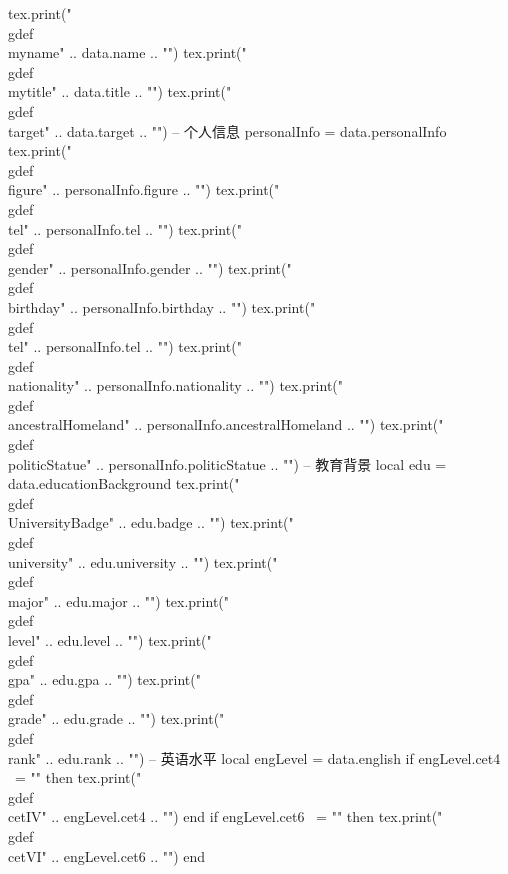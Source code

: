 \documentclass[10pt, a4paper, oneside]{ctexart}
\begin{document}
\begin{luacode}
tex.print("\\gdef\\myname{" .. data.name .. "}") 
tex.print("\\gdef\\mytitle{" .. data.title .. "}")
tex.print("\\gdef\\target{" .. data.target .. "}")
-- 个人信息
personalInfo = data.personalInfo
tex.print("\\gdef\\figure{" .. personalInfo.figure .. "}")
tex.print("\\gdef\\tel{" .. personalInfo.tel .. "}")
tex.print("\\gdef\\gender{" .. personalInfo.gender .. "}")
tex.print("\\gdef\\birthday{" .. personalInfo.birthday .. "}")
tex.print("\\gdef\\tel{" .. personalInfo.tel .. "}")
tex.print("\\gdef\\nationality{" .. personalInfo.nationality .. "}")
tex.print("\\gdef\\ancestralHomeland{" .. personalInfo.ancestralHomeland .. "}")
tex.print("\\gdef\\politicStatue{" .. personalInfo.politicStatue .. "}")
-- 教育背景
local edu = data.educationBackground
tex.print("\\gdef\\UniversityBadge{" .. edu.badge .. "}")
tex.print("\\gdef\\university{" .. edu.university .. "}")
tex.print("\\gdef\\major{" .. edu.major .. "}")
tex.print("\\gdef\\level{" .. edu.level .. "}")
tex.print("\\gdef\\gpa{" .. edu.gpa .. "}")
tex.print("\\gdef\\grade{" .. edu.grade .. "}")
tex.print("\\gdef\\rank{" .. edu.rank .. "}")
-- 英语水平
local engLevel = data.english
if engLevel.cet4 ~= "" then
    tex.print("\\gdef\\cetIV{" .. engLevel.cet4 .. "}")
end
if engLevel.cet6 ~= "" then
    tex.print("\\gdef\\cetVI{" .. engLevel.cet6 .. "}")
end

\end{luacode}
\end{document}
